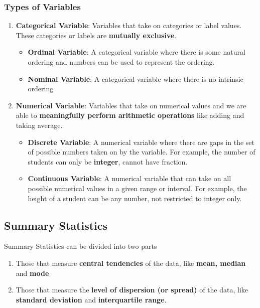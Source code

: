 \documentclass[math,code]{amznotes}
\theoremstyle{remark}
\begin{document}
\subsubsection{Types of Variables}
\begin{enumerate}
    \item \textbf{Categorical Variable}: Variables that take on categories or label values. These categories or labels are \textbf{mutually exclusive}.
    \begin{itemize}
        \item \textbf{Ordinal Variable}: A categorical variable where there is some natural ordering and numbers can be used to represent the ordering.
        \item \textbf{Nominal Variable}: A categorical variable where there is no intrinsic ordering
    \end{itemize}
    \item \textbf{Numerical Variable}: Variables that take on numerical values and we are able to \textbf{meaningfully perform arithmetic operations} like adding and taking average.
    \begin{itemize}
        \item \textbf{Discrete Variable}: A numerical variable where there are gaps in the set of possible numbers taken on by the variable. For example, the number of students can only be \textbf{integer}, cannot have fraction.
        \item \textbf{Continuous Variable}: A numerical variable that can take on all possible numerical values in a given range or interval. For example, the height of a student can be any number, not restricted to integer only.
    \end{itemize}
\end{enumerate}

\subsection{Summary Statistics}
Summary Statistics can be divided into two parts
\begin{enumerate}
    \item Those that measure \textbf{central tendencies} of the data, like \textbf{mean, median} and \textbf{mode}
    \item Those that measure the \textbf{level of dispersion (or spread)} of the data, like \textbf{standard deviation} and \textbf{interquartile range}.
\end{enumerate}
\end{document}
